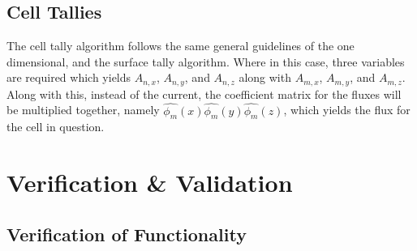 \documentclass[10tma4paper]{article}
\begin{document}
\subsection{Cell Tallies}\label{Collision}

The cell tally algorithm follows the same general guidelines of the one dimensional, and the surface tally algorithm. Where in this case, three variables are required which yields $A_{n,x}$, $A_{n,y}$, and $A_{n,z}$ along with $A_{m,x}$, $A_{m,y}$, and $A_{m,z}$. Along with this, instead of the current, the coefficient matrix for the fluxes will be multiplied together, namely $\hat{\phi_{m}}(x)\hat{\phi_{m}}(y)\hat{\phi_{m}}(z)$, which yields the flux for the cell in question.

\section{Verification \& Validation}\label{vv}
\subsection{Verification of Functionality}\label{P1}
\end{document}
